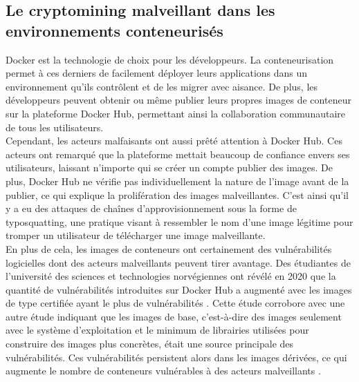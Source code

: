 \subsection{Le cryptomining malveillant dans les environnements conteneurisés}
Docker est la technologie de choix pour les développeurs. La conteneurisation permet à ces derniers de facilement déployer leurs applications dans un environnement qu'ils contrôlent et de les migrer avec aisance. De plus, les développeurs peuvent obtenir ou même publier leurs propres images de conteneur sur la plateforme Docker Hub, permettant ainsi la collaboration communautaire de tous les utilisateurs. \\
\newline
Cependant, les acteurs malfaisants ont aussi prêté attention à Docker Hub. Ces acteurs ont remarqué que la plateforme mettait beaucoup de confiance envers ses  utilisateurs, laissant n'importe qui se créer un compte publier des images. De plus, Docker Hub ne vérifie pas individuellement la nature de l'image avant de la publier, ce qui explique la prolifération des images malveillantes. C'est ainsi qu'il y a eu des attaques de chaînes d'approvisionnement sous la forme de typosquatting, une pratique visant à ressembler le nom d'une image légitime pour tromper un utilisateur de télécharger une image malveillante. \\
\newline
En plus de cela, les images de conteneurs ont certainement des vulnérabilités logicielles dont des acteurs malveillants peuvent tirer avantage. Des étudiantes de l'université des sciences et technologies norvégiennes ont révélé en 2020 que la quantité de vulnérabilités introduites sur Docker Hub a augmenté avec les images de type certifiée ayant le plus de vulnérabilités \cite{wist2020docker}. Cette étude corrobore avec une autre étude indiquant que les images de base, c'est-à-dire des images seulement avec le système d'exploitation et le minimum de librairies utilisées pour construire des images plus concrètes, était une source principale des vulnérabilités. Ces vulnérabilités persistent alors dans les images dérivées, ce qui augmente le nombre de conteneurs vulnérables à des acteurs malveillants \cite{haque2021baseimage}. 

